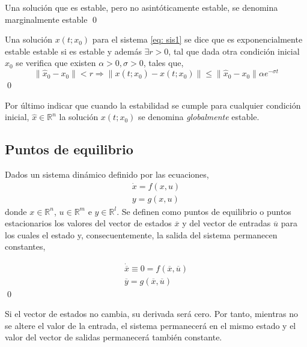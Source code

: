 \begin{definition}
Una solución que es estable, pero no asintóticamente estable, se denomina marginalmente estable
\qed
\end{definition}

\begin{definition}
Una solución $x(t;x_0)$ para el sistema \ref{eq: sis1} se dice que es exponencialmente estable estable si es estable y además  $\exists r>0$, tal que dada otra condición inicial $\hat x_0$ se verifica que existen $\alpha>0 , \sigma >0$, tales que,
\begin{equation}
\|\hat x_0-x_0\|<r \Rightarrow \|x(t;\hat x_0) - x(t;x_0)\| \leq \|\hat x_0 - x_0\| \alpha e^{-\sigma t}
\end{equation}
\qed
\end{definition}

Por último indicar que cuando la estabilidad se cumple para cualquier condición inicial, $\hat x  \in \mathbb{R}^n$ la solución $x(t;x_0)$ se denomina \emph{globalmente} estable.


\subsection{Puntos de equilibrio} 
\begin{definition} Dados un sistema dinámico definido por las ecuaciones,
\begin{align}
\dot{x} = f(x,u)\\
y = g(x,u)
\end{align}
donde $x \in \mathbb{R}^n$, $u \in \mathbb{R}^m$ e $y \in \mathbb{R}^l$. Se definen como puntos de equilibrio o puntos estacionarios los valores del vector de estados $\overline x$ y del vector de entradas $\overline u$ para los cuales el estado y, consecuentemente, la salida del sistema permanecen constantes,

\begin{align}
\dot{\overline x} \equiv 0 = f(\overline x, \overline u)\\
\overline y = g(\overline x,\overline u)
\end{align}
\qed
\end{definition}

Si el vector de estados no cambia, su derivada será cero. Por tanto, mientras no se altere el valor de la entrada, el sistema permanecerá en el mismo estado y el valor del vector de salidas permanecerá también constante. 

